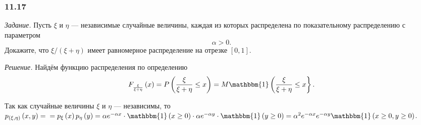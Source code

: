 \subsubsection*{11.17}

\textit{Задание.} Пусть $ \xi $ и $ \eta $ --- независимые случайные величины, каждая из которых распределена по показательному распределению с параметром
$$ \alpha > 0.$$
Докажите, что $ \xi/ \left( \xi + \eta \right) $ имеет равномерное распределение на отрезке $ \left[ 0, 1 \right] $.

\textit{Решение.} Найдём функцию распределения по определению
$$F_{ \frac{ \xi }{ \xi + \eta }} \left( x \right) =
P \left( \frac{ \xi }{ \xi + \eta } \leq x \right) =
M \mathbbm{1} \left( \frac{ \xi }{ \xi + \eta } \leq x \right\}.$$

Так как случайные величины $ \xi $ и $ \eta $ --- независимы, то
$p_{ \left( \xi, \eta \right) } \left( x, y \right) = \\
= p_{ \xi } \left( x \right) p_{ \eta } \left( y \right) =
\alpha e^{- \alpha x} \cdot \mathbbm{1} \left( x \geq 0 \right) \cdot \alpha e^{- \alpha y} \cdot \mathbbm{1} \left( y \geq 0 \right) =
\alpha^2 e^{- \alpha x} e^{- \alpha y} \mathbbm{1} \left( x \geq 0, y \geq 0 \right) $.

